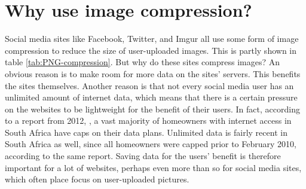 \section{Why use image compression?}
Social media sites like Facebook, Twitter, and Imgur all use some form of image compression to reduce the size of user-uploaded images.
This is partly shown in table \ref{tab:PNG-compression}.
But why do these sites compress images?
An obvious reason is to make room for more data on the sites' servers.
This benefits the sites themselves.
Another reason is that not every social media user has an unlimited amount of internet data, which means that there is a certain pressure on the websites to be lightweight for the benefit of their users.
In fact, according to a report from 2012, \cite{chetty_2012}, a vast majority of homeowners with internet access in South Africa have caps on their data plans.
Unlimited data is fairly recent in South Africa as well, since all homeowners were capped prior to February 2010, according to the same report.
Saving data for the users' benefit is therefore important for a lot of websites, perhaps even more than so for social media sites, which often place focus on user-uploaded pictures.
